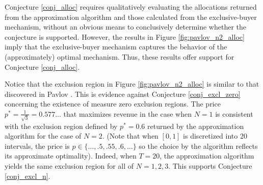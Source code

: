 \noindent Conjecture \ref{conj_alloc} requires qualitatively evaluating the allocations returned from the approximation algorithm and those calculated from the exclusive-buyer mechanism, without an obvious means to conclusively determine whether the conjecture is supported. However, the results in Figure \ref{fig:pavlov_n2_alloc} imply that the exclusive-buyer mechanism captures the behavior of the (approximately) optimal mechanism. Thus, these results offer support for Conjecture \ref{conj_alloc}.

Notice that the exclusion region in Figure \ref{fig:pavlov_n2_alloc} is similar to that discovered in Pavlov \autocite*{pavlov2011optimal}. This is evidence against Conjecture \ref{conj_excl_zero} concerning the existence of measure zero exclusion regions. The price $p^* = \frac{1}{\sqrt{3}} = 0.577...$ that maximizes revenue in the case when $N=1$ is consistent with the exclusion region defined by $p^* = 0.6$ returned by the approximation algorithm for the case of $N=2$. (Note that when $[0,1]$ is discretized into 20 intervals, the price is $p \in \{\dots, .5, .55, .6, \dots\}$ so the choice by the algorithm reflects its approximate optimality). Indeed, when $T=20$, the approximation algorithm yields the same exclusion region for all of $N=1,2,3$. This supports Conjecture \ref{conj_excl_n}.






  
